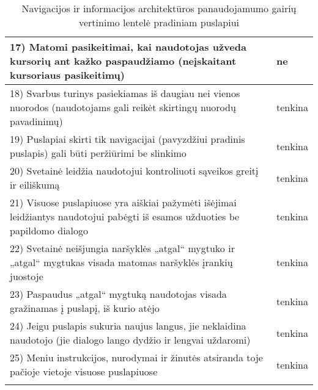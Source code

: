 \documentclass{VUMIFPSkursinis}
\begin{document}
\begin{center}
\begin{longtable}{ |p{}|p{2cm}| }
	17) Matomi pasikeitimai, kai naudotojas užveda kursorių ant kažko paspaudžiamo (neįskaitant kursoriaus pasikeitimų) & ne \\ \hline
	18) Svarbus turinys pasiekiamas iš daugiau nei vienos nuorodos (naudotojams gali reikėt skirtingų nuorodų pavadinimų) & tenkina \\ \hline
	19) Puslapiai skirti tik navigacijai (pavyzdžiui pradinis puslapis) gali būti peržiūrimi be slinkimo & tenkina \\ \hline
	20) Svetainė leidžia naudotojui kontroliuoti sąveikos greitį ir eiliškumą & tenkina \\ \hline
	21) Visuose puslapiuose yra aiškiai pažymėti išėjimai leidžiantys naudotojui pabėgti iš esamos užduoties be papildomo dialogo & tenkina \\ \hline
	22) Svetainė neišjungia naršyklės „atgal“ mygtuko ir „atgal“ mygtukas visada matomas naršyklės įrankių juostoje & tenkina \\ \hline
	23) Paspaudus „atgal“ mygtuką naudotojas visada gražinamas į puslapį, iš kurio atėjo & tenkina \\ \hline
	24) Jeigu puslapis sukuria naujus langus, jie neklaidina naudotojo (jie dialogo lango dydžio ir lengvai uždaromi) & tenkina \\ \hline
	25) Meniu instrukcijos, nurodymai ir žinutės atsiranda toje pačioje vietoje visuose puslapiuose & tenkina \\ \hline
	\caption{Navigacijos ir informacijos architektūros panaudojamumo gairių vertinimo lentelė pradiniam puslapiui}
	\label{navigacijosirIAlentelėPrad}
\end{longtable}
\end{center}
\end{document}
